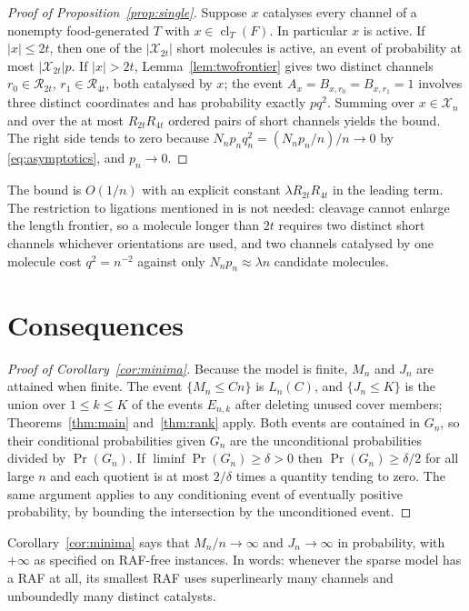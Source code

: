 \documentclass[11pt,a4paper]{article}
\theoremstyle{plain}
\theoremstyle{definition}
\theoremstyle{remark}
\newcommand{\cl}{\operatorname{cl}}
\newcommand{\cR}{\mathcal R}
\newcommand{\cX}{\mathcal X}
\begin{document}
\begin{proof}[Proof of Proposition~\ref{prop:single}]
Suppose $x$ catalyses every channel of a nonempty food-generated $T$ with $x\in\cl_T(F)$. In particular $x$ is active. If $|x|\le2t$, then one of the $|\cX_{2t}|$ short molecules is active, an event of probability at most $|\cX_{2t}|p$. If $|x|>2t$, Lemma~\ref{lem:twofrontier} gives two distinct channels $r_0\in\cR_{2t}$, $r_1\in\cR_{4t}$, both catalysed by $x$; the event $A_x=B_{x,r_0}=B_{x,r_1}=1$ involves three distinct coordinates and has probability exactly $pq^2$. Summing over $x\in\cX_n$ and over the at most $R_{2t}R_{4t}$ ordered pairs of short channels yields the bound. The right side tends to zero because $N_np_nq_n^2=(N_np_n/n)/n\to0$ by \eqref{eq:asymptotics}, and $p_n\to0$.
\end{proof}

The bound is $O(1/n)$ with an explicit constant $\lambda R_{2t}R_{4t}$ in the leading term. The restriction to ligations mentioned in \cite{hordijk2016variable} is not needed: cleavage cannot enlarge the length frontier, so a molecule longer than $2t$ requires two distinct short channels whichever orientations are used, and two channels catalysed by one molecule cost $q^2=n^{-2}$ against only $N_np_n\approx\lambda n$ candidate molecules.

\section{Consequences}\label{sec:consequences}

\begin{proof}[Proof of Corollary~\ref{cor:minima}]
Because the model is finite, $M_n$ and $J_n$ are attained when finite. The event $\{M_n\le Cn\}$ is $L_n(C)$, and $\{J_n\le K\}$ is the union over $1\le k\le K$ of the events $E_{n,k}$ after deleting unused cover members; Theorems~\ref{thm:main} and~\ref{thm:rank} apply. Both events are contained in $G_n$, so their conditional probabilities given $G_n$ are the unconditional probabilities divided by $\Pr(G_n)$. If $\liminf\Pr(G_n)\ge\delta>0$ then $\Pr(G_n)\ge\delta/2$ for all large $n$ and each quotient is at most $2/\delta$ times a quantity tending to zero. The same argument applies to any conditioning event of eventually positive probability, by bounding the intersection by the unconditioned event.
\end{proof}

Corollary~\ref{cor:minima} says that $M_n/n\to\infty$ and $J_n\to\infty$ in probability, with $+\infty$ as specified on RAF-free instances. In words: whenever the sparse model has a RAF at all, its smallest RAF uses superlinearly many channels and unboundedly many distinct catalysts.
\end{document}
